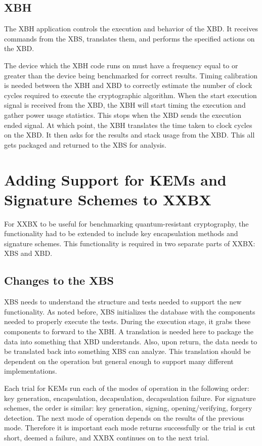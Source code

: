 \documentclass[10pt]{article}
\begin{document}
\subsection{XBH}
The XBH application controls the execution and behavior of the XBD. It receives commands 
from the XBS, translates them, and performs the specified actions on the XBD.

The device which the XBH code runs on must have a frequency equal to or greater than the 
device being benchmarked for correct results. Timing calibration is needed between the XBH 
and XBD to correctly estimate the number of clock cycles required to execute the cryptographic 
algorithm. When the start execution signal is received from the XBD, the XBH will start timing 
the execution and gather power usage statistics. This stops when the XBD sends the 
execution ended signal. At which point, the XBH translates the time taken to clock cycles 
on the XBD. It then asks for the results and stack usage from the XBD.
This all gets packaged and returned to the XBS for analysis.

\section{Adding Support for KEMs and Signature Schemes to XXBX}

For XXBX to be useful for benchmarking quantum-resistant cryptography, the functionality 
had to be extended to include key encapsulation methods and signature schemes. This 
functionality is required in two separate parts of XXBX: XBS and XBD.

\subsection{Changes to the XBS}\label{sec:rom}
XBS needs to understand the structure and tests needed to support the new functionality. 
As noted before, XBS initializes the database with the components needed to properly 
execute the tests. During the execution stage, it grabs these components to forward 
to the XBH. A translation is needed here to package the data into something that XBD  
understands. Also, upon return, the data needs to be translated back into something XBS 
can analyze. This translation should be dependent on the operation but general enough to 
support many different implementations.

Each trial for KEMs run each of the modes of operation in the following order: key generation, 
encapsulation, decapsulation, decapsulation failure. For signature schemes, the order is 
similar: key generation, signing, opening/verifying, forgery detection. The next mode of 
operation depends on the results of the previous mode. Therefore it is important each mode 
returns successfully or the trial is cut short, deemed a failure, and XXBX continues on to the 
next trial.
\end{document}
